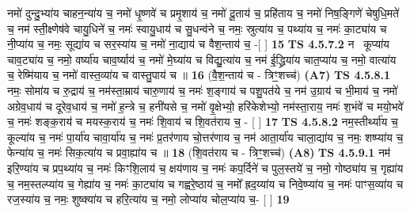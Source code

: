 \documentclass[17pt]{extarticle}
\begin{document}
                  नमो॑ दुन्दु॒भ्या॑य चाहन॒न्या॑य च॒ नमो॑ धृ॒ष्णवे॑ च प्रमृ॒शाय॑ च॒ नमो॑ दू॒ताय॑ च॒ प्रहि॑ताय च॒ नमो॑ निष॒ङ्गिणे॑ चेषुधि॒मते॑ च॒ नम॑ स्ती॒क्ष्णेष॑वे चायु॒धिने॑ च॒ नमः॑ स्वायु॒धाय॑ च सु॒धन्व॑ने च॒ नमः॒ स्रुत्या॑य च॒ पथ्या॑य च॒ नमः॑ का॒ट्या॑य च नी॒प्या॑य च॒ नमः॒ सूद्या॑य च सर॒स्या॑य च॒ नमो॑ ना॒द्याय॑ च वैश॒न्ताय॑ च॒ -[  ] \textbf{  15} \newline
                  \newline
                                \textbf{ TS 4.5.7.2} \newline
                  नमः᳡कूप्या॑य चाव॒ट्या॑य च॒ नमो॒ वर्ष्या॑य चाव॒र्ष्याय॑ च॒ नमो॑ मे॒घ्या॑य च विद्यु॒त्या॑य च॒ नम॑ ई॒द्ध्रिया॑य चात॒प्या॑य च॒ नमो॒ वात्या॑य च॒ रेष्मि॑याय च॒ नमो॑ वास्त॒व्या॑य च वास्तु॒पाय॑ च ॥ \textbf{  16} \newline
                  \newline
                      (वै॒श॒न्ताय॑ च - त्रिꣳ॒॒शच्च॑)  \textbf{(A7)} \newline \newline
                                        \textbf{ TS 4.5.8.1} \newline
                  नमः॒ सोमा॑य च रु॒द्राय॑ च॒ नम॑स्ता॒म्राय॑ चारु॒णाय॑ च॒ नमः॑ श॒ङ्गाय॑ च पशु॒पत॑ये च॒ नम॑ उ॒ग्राय॑ च भी॒माय॑ च॒ नमो॑ अग्रेव॒धाय॑ च दूरेव॒धाय॑ च॒ नमो॑ ह॒न्त्रे च॒ हनी॑यसे च॒ नमो॑ वृ॒क्षेभ्यो॒ हरि॑केशेभ्यो॒ नम॑स्ता॒राय॒ नमः॑ श॒भंवे॑ च मयो॒भवे॑ च॒ नमः॑ शङ्क॒राय॑ च मयस्क॒राय॑ च॒ नमः॑ शि॒वाय॑ च शि॒वत॑राय च॒ - [  ] \textbf{  17} \newline
                  \newline
                                \textbf{ TS 4.5.8.2} \newline
                  नम॒स्तीर्थ्या॑य च॒ कूल्या॑य च॒ नमः॑ पा॒र्या॑य चावा॒र्या॑य च॒ नमः॑ प्र॒तर॑णाय चो॒त्तर॑णाय च॒ नम॑ आता॒र्या॑य चाला॒द्या॑य च॒ नमः॒ शष्प्या॑य च॒ फेन्या॑य च॒ नमः॑ सिक॒त्या॑य च प्रवा॒ह्या॑य च ॥ \textbf{  18} \newline
                  \newline
                      (शि॒वत॑राय च - त्रिꣳ॒॒शच्च॑)  \textbf{(A8)} \newline \newline
                                        \textbf{ TS 4.5.9.1} \newline
                  नम॑ इरि॒ण्या॑य च प्रप॒थ्या॑य च॒ नमः॑ किꣳशि॒लाय॑ च॒ क्षय॑णाय च॒ नमः॑ कप॒र्दिने॑ च पुल॒स्तये॑ च॒ नमो॒ गोष्ठ्या॑य च॒ गृह्या॑य च॒ नम॒स्तल्प्या॑य च॒ गेह्या॑य च॒ नमः॑ का॒ट्या॑य च गह्वरे॒ष्ठाय॑ च॒ नमो᳚ ह्रद॒य्या॑य च निवे॒ष्प्या॑य च॒ नमः॑ पाꣳस॒व्या॑य च रज॒स्या॑य च॒ नमः॒ शुष्क्या॑य च हरि॒त्या॑य च॒ नमो॒ लोप्या॑य चोल॒प्या॑य च॒- [  ] \textbf{  19} \newline
\end{document}
